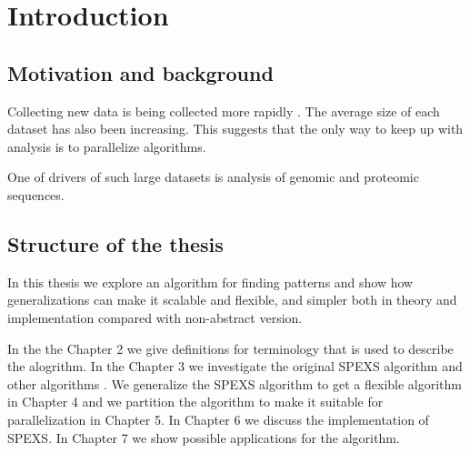 \chapter{Introduction}


\section{Motivation and background}

Collecting new data is being collected more rapidly \cite{HowIsGenomeDoing} . The average size of each dataset has also been increasing. This suggests that the only way to keep up with analysis is to parallelize algorithms.

One of drivers of such large datasets is analysis of genomic and proteomic sequences. 




\section{Structure of the thesis}

In this thesis we explore an algorithm for finding patterns and show how
generalizations can make it scalable and flexible, and simpler both in 
theory and implementation compared with non-abstract version.


In the the Chapter 2 we give definitions for terminology that is used to
describe the alogrithm. In the Chapter 3 we investigate the original
SPEXS algorithm \cite{spexs} and other algorithms . We generalize the SPEXS algorithm
to get a flexible algorithm in Chapter 4 and we partition the algorithm
to make it suitable for parallelization in Chapter 5. In Chapter 6 we
discuss the implementation of SPEXS. In Chapter 7 we show possible applications
for the algorithm.
